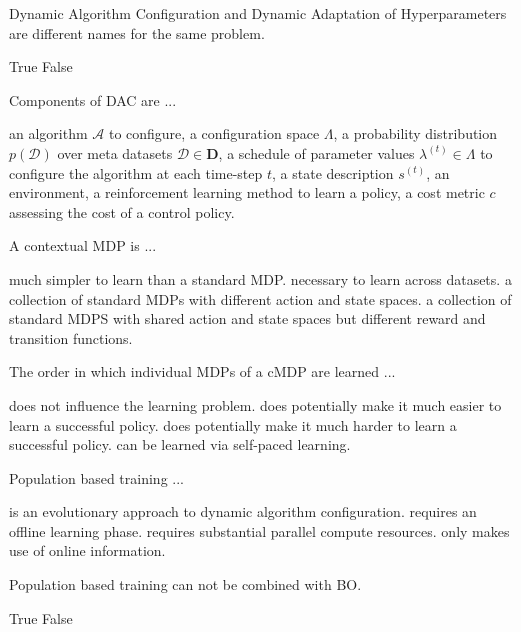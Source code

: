 \documentclass{exam}
\begin{document}
\begin{questions}
\question Dynamic Algorithm Configuration and Dynamic Adaptation of Hyperparameters are different names for the same problem.
\begin{choices}
    \choice True
    \choice False %
\end{choices}

\question Components of DAC are ...
\begin{choices}
    \choice an algorithm $\mathcal{A}$ to configure, %
    \choice a configuration space $\Lambda$, %
    \choice a probability distribution $p(\mathcal{D})$ over meta datasets $\mathcal{D}\in\mathbf{D}$, %
    \choice a schedule of parameter values $\lambda^{(t)}\in\Lambda$ to configure the algorithm at each time-step $t$,
    \choice a state description $s^{(t)}$,
    \choice an environment,
    \choice a reinforcement learning method to learn a policy,
    \choice a cost metric $c$ assessing the cost of a control policy. %
\end{choices}

\question A contextual MDP is ...
\begin{choices}
    \choice much simpler to learn than a standard MDP.
    \choice necessary to learn across datasets. %
    \choice a collection of standard MDPs with different action and state spaces.
    \choice a collection of standard MDPS with shared action and state spaces but different reward and transition functions.
\end{choices}

\question The order in which individual MDPs of a cMDP are learned ...
\begin{choices}
    \choice does not influence the learning problem.
    \choice does potentially make it much easier to learn a successful policy. %
    \choice does potentially make it much harder to learn a successful policy. %
    \choice can be learned via self-paced learning. %
\end{choices}

\question Population based training ...
\begin{choices}
    \choice is an evolutionary approach to dynamic algorithm configuration.
    \choice requires an offline learning phase.
    \choice requires substantial parallel compute resources. %
    \choice only makes use of online information. %
\end{choices}

\question Population based training can not be combined with BO.
\begin{choices}
    \choice True
    \choice False %
\end{choices}


\end{questions}
\end{document}
